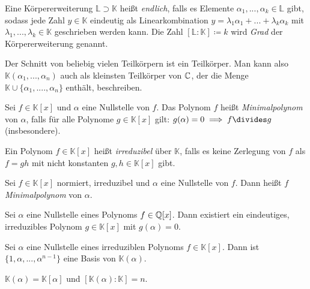 \documentclass{cheat-sheet}
\newcommand{\K}{\mathbb{K}} %
\renewcommand{\L}{\mathbb{L}} %
\begin{document}
\begin{defn}
  Eine Körpererweiterung $\L \supset \K$ heißt \emph{endlich}, falls es Elemente $\alpha_1, ..., \alpha_k \in \L$ gibt, sodass jede Zahl $y \in \K$ eindeutig als Linearkombination $y = \lambda_1 \alpha_1 + ... + \lambda_k \alpha_k$ mit $\lambda_1, ..., \lambda_k \in \K$ geschrieben werden kann. Die Zahl $[\L : \K] \coloneqq k$ wird \emph{Grad} der Körpererweiterung genannt.
\end{defn}

\begin{bem}
  Der Schnitt von beliebig vielen Teilkörpern ist ein Teilkörper. Man kann also $\K(\alpha_1, ..., \alpha_n)$ auch als kleinsten Teilkörper von $\mathbb{C}$, der die Menge $\K \cup \{ \alpha_1, ...., \alpha_n \}$ enthält, beschreiben.
\end{bem}

\begin{defn}
  Sei $f \in \K[x]$ und $\alpha$ eine Nullstelle von $f$. Das Polynom $f$ heißt \emph{Minimalpolynom} von $\alpha$, falls für alle Polynome $g \in \K[x]$ gilt: $g(\alpha) = 0 \implies f \divides g$ (insbesondere).
\end{defn}

\begin{defn}
  Ein Polynom $f \in \K[x]$ heißt \emph{irreduzibel} über $\K$, falls es keine Zerlegung von $f$ als $f = gh$ mit nicht konstanten $g, h \in \K[x]$ gibt.
\end{defn}

\begin{defn}
  Sei $f \in \K[x]$ normiert, irreduzibel und $\alpha$ eine Nullstelle von $f$. Dann heißt $f$ \emph{Minimalpolynom} von $\alpha$.
\end{defn}

\begin{bem}
  Sei $\alpha$ eine Nullstelle eines Polynoms $f \in \mathbb{Q}[x]$. Dann existiert ein eindeutiges, irreduzibles Polynom $g \in \K[x]$ mit $g(\alpha) = 0$.
\end{bem}

\begin{satz}
  Sei $\alpha$ eine Nullstelle eines irreduziblen Polynoms $f \in \K[x]$. Dann ist $\{ 1, \alpha, ..., \alpha^{n-1} \}$ eine Basis von $\K(\alpha)$.
\end{satz}

\begin{kor}
  $\K(\alpha) = \K[\alpha]$ und $[\K(\alpha) : \K] = n$.
\end{kor}
\end{document}
